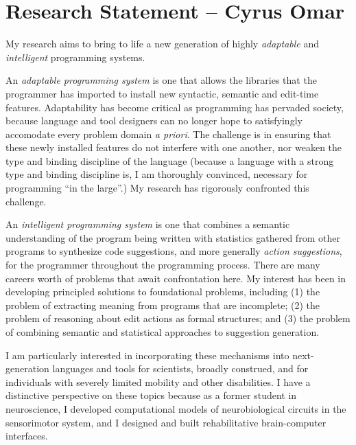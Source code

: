 \documentclass[9pt]{extarticle}
\begin{document}
\vspace{-8px}
\section*{Research Statement -- Cyrus Omar}
\vspace{-6px}
My research aims to bring to life a new generation of highly \emph{adaptable} and \emph{intelligent} programming systems.

An \emph{adaptable programming system} is one that allows the libraries that the programmer has imported to install new syntactic, semantic and edit-time features. Adaptability has become critical as programming has pervaded society, because language and tool designers can no longer hope to satisfyingly accomodate every problem domain \emph{a priori}. The challenge is in ensuring that these newly installed features do not interfere with one another, nor weaken the type and binding discipline of the language (because a language with a strong type and binding discipline is, I am thoroughly convinced, necessary for programming ``in the large''.) My research has rigorously confronted this challenge.  %

An \emph{intelligent programming system} is one that combines a semantic understanding of the program being written with statistics gathered from other programs to synthesize code suggestions, and more generally \emph{action suggestions}, for the programmer throughout the programming process. There are many careers worth of problems that await confrontation here. My interest has been in developing principled solutions to foundational problems, including (1) the problem of extracting meaning from programs that are incomplete; (2) the problem of reasoning about edit actions as formal structures; and (3) the problem of combining semantic and statistical approaches to suggestion generation.

I am particularly interested in incorporating these mechanisms into next-generation languages and tools for scientists, broadly construed, and for individuals with severely limited mobility and other disabilities. I have a distinctive perspective on these topics because as a former student in neuroscience, I developed computational models of neurobiological circuits in the sensorimotor system, and I designed and built rehabilitative brain-computer interfaces.
\end{document}
